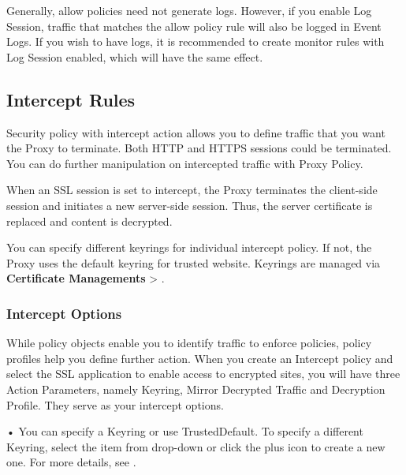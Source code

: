 Generally, allow policies need not generate logs. However, if you enable Log Session, traffic that matches the allow policy rule will also be logged in Event Logs. 
If you wish to have logs, it is recommended to create monitor rules with Log Session enabled, which will have the same effect.

\subsection*{\hypertarget{link:Intercept Rules}{Intercept Rules}}
\label{sec:policies:security:intercept}

Security policy with intercept action allows you to define traffic that you want the Proxy to terminate. Both HTTP and HTTPS sessions could be terminated. 
You can do further manipulation on intercepted traffic with Proxy Policy. 


When an SSL session is set to intercept, the Proxy terminates the client-side session and initiates a new server-side session. 
Thus, the server certificate is replaced and content is decrypted. 


You can specify different keyrings for individual intercept policy. If not, the Proxy uses the default keyring for trusted website. 
Keyrings are managed via \textbf{Certificate Managements} > \textbf{\hyperlink{link:Decryption Keyrings}{\color{linkblue}{Decryption Keyrings}}}.

\subsubsection*{\hypertarget{link:Intercept Options}{Intercept Options}}
\label{sec:policies:security:intercept:option}

While policy objects enable you to identify traffic to enforce policies, policy profiles help you define further action. 
When you create an Intercept policy and select the SSL application to enable access to encrypted sites, you will have three Action Parameters, 
namely Keyring, Mirror Decrypted Traffic and Decryption Profile. They serve as your intercept options. 


• You can specify a Keyring or use TrustedDefault. To specify a different Keyring, select the item from drop-down or click the plus icon to create a new one. For more details, see \hyperlink{link:Decryption Keyrings}{\color{linkblue}{Decryption Keyrings}}. 


